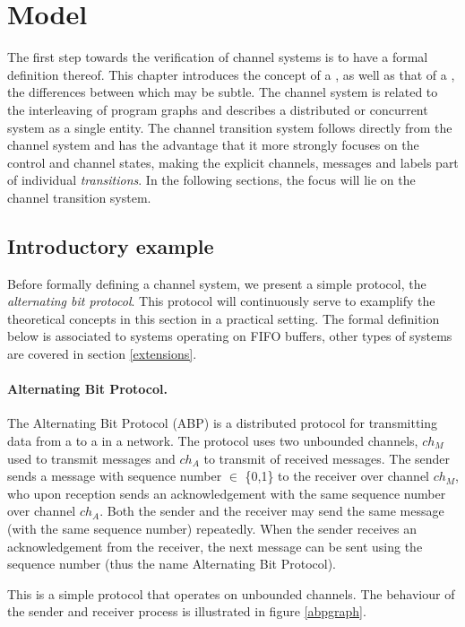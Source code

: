 \section{Model}
The first step towards the verification of channel systems is to have a formal definition thereof. This chapter introduces the concept of a , as well as that of a , the differences between which may be subtle. The channel system is related to the interleaving of program graphs and describes a distributed or concurrent system as a single entity. The channel transition system follows directly from the channel system and has the advantage that it more strongly focuses on the control and channel states, making the explicit channels, messages and labels part of individual \emph{transitions}. In the following sections, the focus will lie on the channel transition system.

\subsection{Introductory example}
\label{definitions}
Before formally defining a channel system, we present a simple protocol, the \emph{alternating bit protocol}. This protocol will continuously serve to examplify the theoretical concepts in this section in a practical setting. The formal definition below is associated to systems operating on FIFO buffers, other types of systems are covered in section \ref{extensions}. 

\paragraph{Alternating Bit Protocol.} The Alternating Bit Protocol (ABP) is a distributed protocol for transmitting data from a  to a  in a network. The protocol uses two unbounded channels, $ch_M$ used to transmit messages and $ch_A$ to transmit  of received messages. The sender sends a message with sequence number  $\in$ \{0,1\} to the receiver over channel $ch_M$, who upon reception sends an acknowledgement with the same sequence number over channel $ch_A$. Both the sender and the receiver may send the same message (with the same sequence number) repeatedly. When the sender receives an acknowledgement from the receiver, the next message can be sent using the sequence number  (thus the name Alternating Bit Protocol).

This is a simple protocol that operates on unbounded channels. The behaviour of the sender and receiver process is illustrated in figure \ref{abpgraph}.

